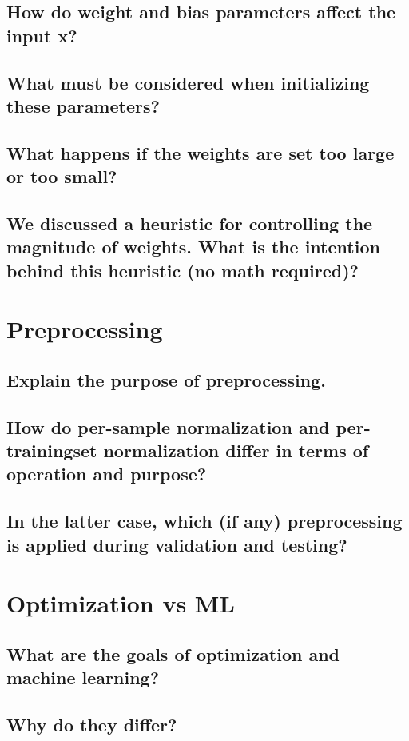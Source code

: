 \subsection{How do weight and bias parameters affect the input x?}
\subsection{What must be considered when initializing these parameters?}
\subsection{What happens if the weights are set too large or too small?}
\subsection{We discussed a heuristic for controlling the magnitude of weights. What is the intention behind this heuristic (no math required)?}

\section{Preprocessing}
\subsection{Explain the purpose of preprocessing.}
\subsection{How do per-sample normalization and per-trainingset normalization differ in terms of operation and purpose?}
\subsection{In the latter case, which (if any) preprocessing is applied during validation and testing?}

\section{Optimization vs ML}
\subsection{What are the goals of optimization and machine learning?}
\subsection{Why do they differ?}

